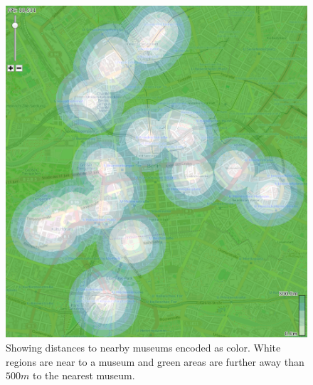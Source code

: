\begin{figure}[b]
        \centering
		\includegraphics[width=0.4\linewidth]{imgs/museum}
        \caption{Showing distances to nearby museums encoded as color. White regions
        are near to a museum and green areas are further away than $500m$ to the
        nearest museum.}
		\label{fig:museum}
\end{figure}

